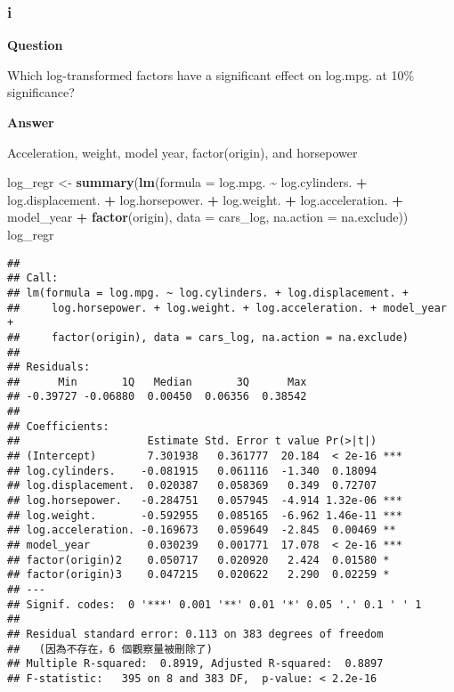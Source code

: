 \documentclass[
]{article}
\newenvironment{Shaded}{\begin{snugshade}}{\end{snugshade}}
\newcommand{\AttributeTok}[1]{\textcolor[rgb]{0.13,0.29,0.53}{#1}}
\newcommand{\FunctionTok}[1]{\textcolor[rgb]{0.13,0.29,0.53}{\textbf{#1}}}
\newcommand{\NormalTok}[1]{#1}
\newcommand{\OtherTok}[1]{\textcolor[rgb]{0.56,0.35,0.01}{#1}}
\newcommand{\SpecialCharTok}[1]{\textcolor[rgb]{0.81,0.36,0.00}{\textbf{#1}}}
\begin{document}
\hypertarget{i}{%
\subsubsection{i}\label{i}}

\textbf{Question}

Which log-transformed factors have a significant effect on log.mpg. at
10\% significance?

\textbf{Answer}

Acceleration, weight, model year, factor(origin), and horsepower

\begin{Shaded}
\begin{Highlighting}[]
\NormalTok{log\_regr }\OtherTok{\textless{}{-}} \FunctionTok{summary}\NormalTok{(}\FunctionTok{lm}\NormalTok{(}\AttributeTok{formula =}\NormalTok{ log.mpg. }\SpecialCharTok{\textasciitilde{}}\NormalTok{ log.cylinders. }\SpecialCharTok{+}\NormalTok{ log.displacement. }\SpecialCharTok{+} 
\NormalTok{    log.horsepower. }\SpecialCharTok{+}\NormalTok{ log.weight. }\SpecialCharTok{+}\NormalTok{ log.acceleration. }\SpecialCharTok{+}\NormalTok{ model\_year }\SpecialCharTok{+} 
    \FunctionTok{factor}\NormalTok{(origin), }\AttributeTok{data =}\NormalTok{ cars\_log, }\AttributeTok{na.action =}\NormalTok{ na.exclude))}
\NormalTok{log\_regr}
\end{Highlighting}
\end{Shaded}

\begin{verbatim}
## 
## Call:
## lm(formula = log.mpg. ~ log.cylinders. + log.displacement. + 
##     log.horsepower. + log.weight. + log.acceleration. + model_year + 
##     factor(origin), data = cars_log, na.action = na.exclude)
## 
## Residuals:
##      Min       1Q   Median       3Q      Max 
## -0.39727 -0.06880  0.00450  0.06356  0.38542 
## 
## Coefficients:
##                    Estimate Std. Error t value Pr(>|t|)    
## (Intercept)        7.301938   0.361777  20.184  < 2e-16 ***
## log.cylinders.    -0.081915   0.061116  -1.340  0.18094    
## log.displacement.  0.020387   0.058369   0.349  0.72707    
## log.horsepower.   -0.284751   0.057945  -4.914 1.32e-06 ***
## log.weight.       -0.592955   0.085165  -6.962 1.46e-11 ***
## log.acceleration. -0.169673   0.059649  -2.845  0.00469 ** 
## model_year         0.030239   0.001771  17.078  < 2e-16 ***
## factor(origin)2    0.050717   0.020920   2.424  0.01580 *  
## factor(origin)3    0.047215   0.020622   2.290  0.02259 *  
## ---
## Signif. codes:  0 '***' 0.001 '**' 0.01 '*' 0.05 '.' 0.1 ' ' 1
## 
## Residual standard error: 0.113 on 383 degrees of freedom
##   (因為不存在，6 個觀察量被刪除了)
## Multiple R-squared:  0.8919, Adjusted R-squared:  0.8897 
## F-statistic:   395 on 8 and 383 DF,  p-value: < 2.2e-16
\end{verbatim}
\end{document}
